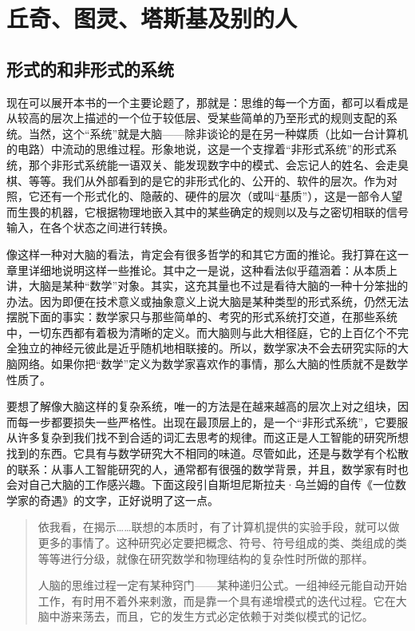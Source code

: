 
\chapter{丘奇、图灵、塔斯基及别的人}

\section{形式的和非形式的系统}

现在可以展开本书的一个主要论题了，那就是：思维的每一个方面，都可以看成是从较高的层次上描述的一个位于较低层、受某些简单的乃至形式的规则支配的系统。当然，这个“系统”就是大脑——除非谈论的是在另一种媒质（比如一台计算机的电路）中流动的思维过程。形象地说，这是一个支撑着“非形式系统”的形式系统，那个非形式系统能一语双关、能发现数字中的模式、会忘记人的姓名、会走臭棋、等等。我们从外部看到的是它的非形式化的、公开的、软件的层次。作为对照，它还有一个形式化的、隐蔽的、硬件的层次（或叫“基质”），这是一部令人望而生畏的机器，它根据物理地嵌入其中的某些确定的规则以及与之密切相联的信号输入，在各个状态之间进行转换。

像这样一种对大脑的看法，肯定会有很多哲学的和其它方面的推论。我打算在这一章里详细地说明这样一些推论。其中之一是说，这种看法似乎蕴涵着：从本质上讲，大脑是某种“数学”对象。其实，这充其量也不过是看待大脑的一种十分笨拙的办法。因为即便在技术意义或抽象意义上说大脑是某种类型的形式系统，仍然无法摆脱下面的事实：数学家只与那些简单的、考究的形式系统打交道，在那些系统中，一切东西都有着极为清晰的定义。而大脑则与此大相径庭，它的上百亿个不完全独立的神经元彼此是近乎随机地相联接的。所以，数学家决不会去研究实际的大脑网络。如果你把“数学”定义为数学家喜欢作的事情，那么大脑的性质就不是数学性质了。

要想了解像大脑这样的复杂系统，唯一的方法是在越来越高的层次上对之组块，因而每一步都要损失一些严格性。出现在最顶层上的，是一个“非形式系统”，它要服从许多复杂到我们找不到合适的词汇去思考的规律。而这正是人工智能的研究所想找到的东西。它具有与数学研究大不相同的味道。尽管如此，还是与数学有个松散的联系：从事人工智能研究的人，通常都有很强的数学背景，并且，数学家有时也会对自己大脑的工作感兴趣。下面这段引自斯坦尼斯拉夫·乌兰姆的自传《一位数学家的奇遇》的文字，正好说明了这一点。

\begin{quote}
依我看，在揭示……联想的本质时，有了计算机提供的实验手段，就可以做更多的事情了。这种研究必定要把概念、符号、符号组成的类、类组成的类等等进行分级，就像在研究数学和物理结构的复杂性时所做的那样。

人脑的思维过程一定有某种窍门——某种递归公式。一组神经元能自动开始工作，有时用不着外来剌激，而是靠一个具有递增模式的迭代过程。它在大脑中游来荡去，而且，它的发生方式必定依赖于对类似模式的记忆。
\end{quote}

